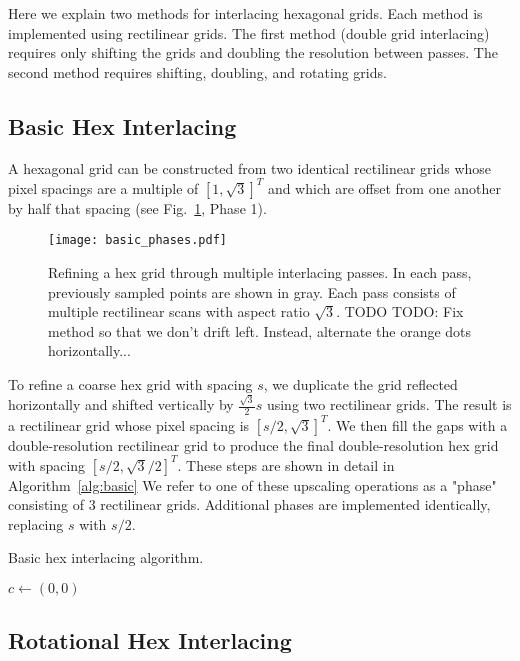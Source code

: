 \documentclass{article}
\begin{document}
Here we explain two methods for interlacing hexagonal grids.
%
Each method is implemented using rectilinear grids.
%
The first method (double grid interlacing) requires only shifting the grids and doubling the resolution between passes.
%
The second method requires shifting, doubling, and rotating grids.


\subsection{Basic Hex Interlacing}
\label{double-grid-interlacing}

A hexagonal grid can be constructed from two identical rectilinear grids
whose pixel spacings are a multiple of $[1, \sqrt{3}]^T$ and which are offset from one another by half that spacing (see Fig.~\ref{fig:basicphases}, Phase 1).

\begin{figure}[ht]
\centering
\texttt{[image: basic\_phases.pdf]}
\caption{
\label{fig:basicphases} Refining a hex grid through multiple interlacing passes.
%
In each pass, previously sampled points are shown in gray.
%
Each pass consists of multiple rectilinear scans with aspect ratio $\sqrt{3}$.
%
TODO TODO: Fix method so that we don't drift left. Instead, alternate the orange dots horizontally...
}
\end{figure}

To refine a coarse hex grid with spacing $s$, we duplicate the grid reflected horizontally and shifted vertically by $\frac{\sqrt{3}}{2} s$ using two rectilinear grids.
%
The result is a rectilinear grid whose pixel spacing is $[s/2, \sqrt{3}]^T$.
%
We then fill the gaps with a double-resolution rectilinear grid to produce the final double-resolution hex grid with spacing $[s/2, \sqrt{3}/2]^T$.
%
These steps are shown in detail in Algorithm~\ref{alg:basic}
%
We refer to one of these upscaling operations as a "phase" consisting of 3 rectilinear grids.
%
Additional phases are implemented identically, replacing $s$ with $s/2$.

\begin{algorithm}
\caption{Basic hex interlacing algorithm.}\label{alg:basic}
\begin{algorithmic}
	\State $c \gets (0, 0)$
\end{algorithmic}
\end{algorithm}

\subsection{Rotational Hex Interlacing}
\label{triple-grid-interlacing}
\end{document}

